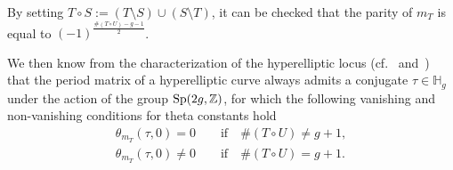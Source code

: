 \documentclass[pdftex]{sigma}
\numberwithin{equation}{section}
\newcommand{\HH}{{\mathbb{H}}}
\newcommand{\ZZ}{{\mathbb{Z}}}
\def\ZZ{{\mathbb Z}}
\begin{document}
By setting $T\circ S:= (T\setminus S)\cup (S\setminus T)$, it can be checked that the parity of $m_T$ is equal to $(-1)^{\frac{\#(T\circ U)-g-1}{2}}$.

We then know from the characterization of the hyperelliptic locus (cf.~\cite{Th} and~\cite{mu}) that the period matrix of a hyperelliptic curve always admits a conjugate $\tau \in \HH_g$ under the action of the group ${\rm Sp}(2g, \ZZ)$, for which the following vanishing and non-vanishing conditions for theta constants hold
\begin{gather}
\theta_{m_T} (\tau,0)=0 \qquad \text{if} \quad \#(T\circ U)\neq g+1, \label{vanishing}\\
\theta_{m_T} (\tau,0) \neq 0 \qquad \text{if} \quad \#(T\circ U) = g+1. \label{nonvanishing}
\end{gather}
\end{document}
